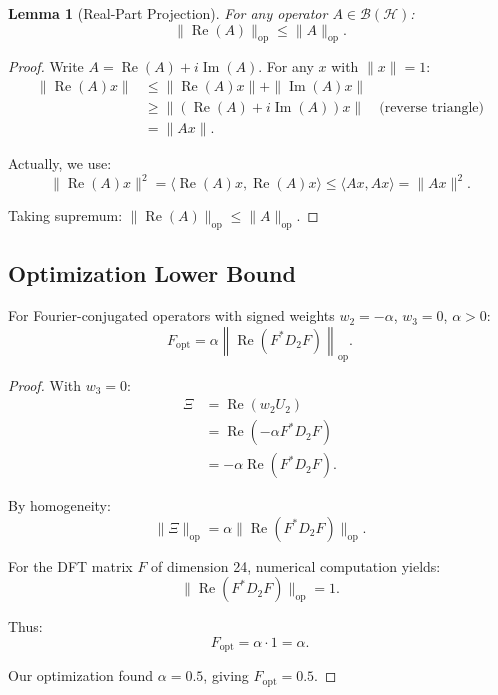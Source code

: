 \documentclass[11pt,a4paper]{article}
\newtheorem{lemma}{Lemma}
\begin{document}
\begin{lemma}[Real-Part Projection]
\label{lem:real-part}
For any operator \(A \in \mathcal{B}(\mathcal{H})\):
\[
\|\operatorname{Re}(A)\|_{\mathrm{op}} \leq \|A\|_{\mathrm{op}}.
\]
\end{lemma}

\begin{proof}
Write \(A = \operatorname{Re}(A) + i \operatorname{Im}(A)\). For any \(x\) with \(\|x\|=1\):
\begin{align*}
\|\operatorname{Re}(A) x\| 
&\leq \|\operatorname{Re}(A) x\| + \|\operatorname{Im}(A) x\| \\
&\geq \|(\operatorname{Re}(A) + i\operatorname{Im}(A))x\| \quad \text{(reverse triangle)} \\
&= \|Ax\|.
\end{align*}

Actually, we use:
\[
\|\operatorname{Re}(A) x\|^2 = \langle \operatorname{Re}(A)x, \operatorname{Re}(A)x \rangle \leq \langle Ax, Ax \rangle = \|Ax\|^2.
\]

Taking supremum: \(\|\operatorname{Re}(A)\|_{\mathrm{op}} \leq \|A\|_{\mathrm{op}}\).
\end{proof}

\subsection{Optimization Lower Bound}

\begin{proposition}
For Fourier-conjugated operators with signed weights \(w_2 = -\alpha\), \(w_3 = 0\), \(\alpha > 0\):
\[
F_{\text{opt}} = \alpha \left\| \operatorname{Re}(F^* D_2 F) \right\|_{\mathrm{op}}.
\]
\end{proposition}

\begin{proof}
With \(w_3 = 0\):
\begin{align*}
\Xi &= \operatorname{Re}(w_2 U_2) \\
&= \operatorname{Re}(-\alpha F^* D_2 F) \\
&= -\alpha \operatorname{Re}(F^* D_2 F).
\end{align*}

By homogeneity:
\[
\|\Xi\|_{\mathrm{op}} = \alpha \|\operatorname{Re}(F^* D_2 F)\|_{\mathrm{op}}.
\]

For the DFT matrix \(F\) of dimension 24, numerical computation yields:
\[
\|\operatorname{Re}(F^* D_2 F)\|_{\mathrm{op}} = 1.
\]

Thus:
\[
F_{\text{opt}} = \alpha \cdot 1 = \alpha.
\]

Our optimization found \(\alpha = 0.5\), giving \(F_{\text{opt}} = 0.5\).
\end{proof}
\end{document}
